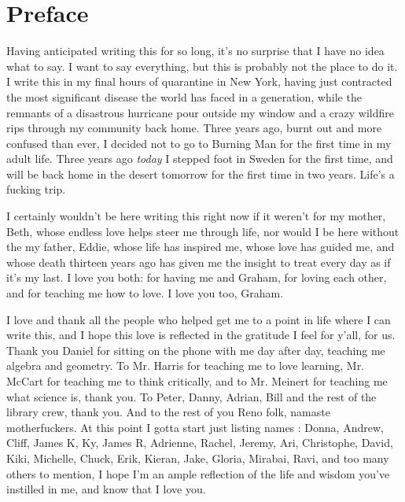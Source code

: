 \documentclass[11pt, a4paper]{article}
\begin{document}
\thispagestyle{empty}
\newpage
\section*{Preface}

Having anticipated writing this for so long, it's no surprise that I have no
idea what to say. I want to say everything, but this is probably not the place
to do it. I write this in my final hours of quarantine in New York, having just
contracted the most significant disease the world has faced in a generation,
while the remnants of a disastrous hurricane pour outside my window and a crazy
wildfire rips through my community back home. Three years ago, burnt out and
more confused than ever, I decided not to go to Burning Man for the first time
in my adult life. Three years ago \emph{today} I stepped foot in Sweden for the
first time, and will be back home in the desert tomorrow for the first time in
two years. Life's a fucking trip.

I certainly wouldn't be here writing this right now if it weren't for my mother,
Beth, whose endless love helps steer me through life, nor would I be here
without the my father, Eddie, whose life has inspired me, whose love has guided
me, and whose death thirteen years ago has given me the insight to treat every
day as if it's my last. I love you both: for having me and Graham, for
loving each other, and for teaching me how to love. I love you too, Graham.

I love and thank all the people who helped get me to a point in life where I can
write this, and I hope this love is reflected in the gratitude I feel for y'all,
for us. Thank you Daniel for sitting on the phone with me day after day,
teaching me algebra and geometry. To Mr. Harris for teaching me to love
learning, Mr. McCart for teaching me to think critically, and to Mr. Meinert for
teaching me what science is, thank you. To Peter, Danny, Adrian, Bill and the
rest of the library crew, thank you. And to the rest of you Reno folk, namaste
motherfuckers. At this point I gotta start just listing names : Donna, Andrew,
Cliff, James K, Ky, James R, Adrienne, Rachel, Jeremy, Ari, Christophe, David,
Kiki, Michelle, Chuck, Erik, Kieran, Jake, Gloria, Mirabai, Ravi, and too many
others to mention, I hope I'm an ample reflection of the life and wisdom you've
instilled in me, and know that I love you.
\end{document}
